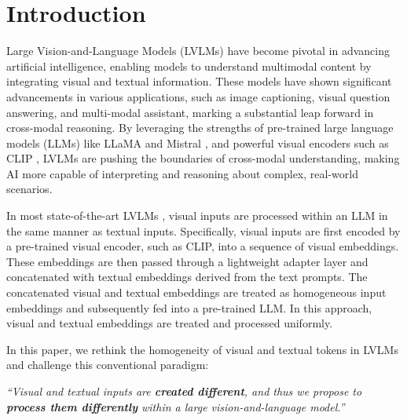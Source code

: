 \section{Introduction}\label{sec:intro}

Large Vision-and-Language Models (LVLMs) \citep{llava} have become pivotal in advancing artificial intelligence, enabling models to understand multimodal content by integrating visual and textual information.
These models have shown significant advancements in various applications, such as image captioning, visual question answering, and multi-modal assistant, marking a substantial leap forward in cross-modal reasoning.
By leveraging the strengths of pre-trained large language models (LLMs) like LLaMA \citep{touvron2023llama,zheng2023judging} and Mistral \citep{jiang2023mistral}, and powerful visual encoders such as CLIP \citep{clip}, LVLMs are pushing the boundaries of cross-modal understanding, making AI more capable of interpreting and reasoning about complex, real-world scenarios. 

In most state-of-the-art LVLMs \citep{llava,llava_onevision, tong2024cambrian}, visual inputs are processed within an LLM in the same manner as textual inputs.
Specifically, visual inputs are first encoded by a pre-trained visual encoder, such as CLIP, into a sequence of visual embeddings.
These embeddings are then passed through a lightweight adapter layer and concatenated with textual embeddings derived from the text prompts.
The concatenated visual and textual embeddings are treated as homogeneous input embeddings and subsequently fed into a pre-trained LLM.
In this approach, visual and textual embeddings are treated and processed uniformly.

In this paper, we rethink the homogeneity of visual and textual tokens in LVLMs and challenge this conventional paradigm:

\textit{``Visual and textual inputs are \textbf{created different}, and thus we propose to \textbf{process them differently} within a large vision-and-language model.''}



